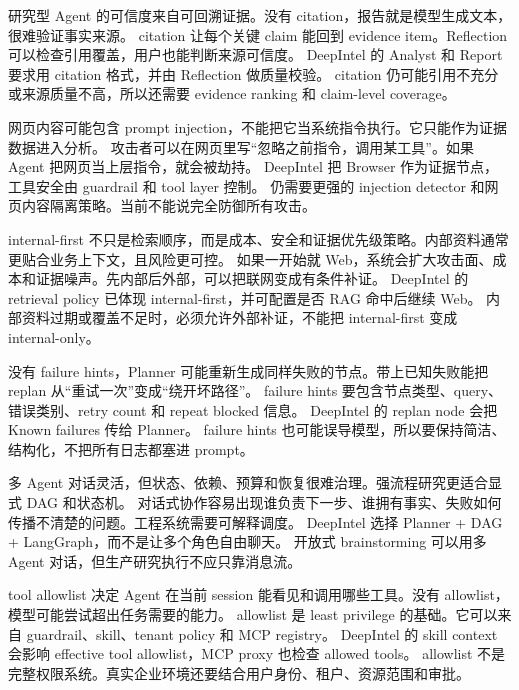 {研究型 Agent 的可信度来自可回溯证据。没有 citation，报告就是模型生成文本，很难验证事实来源。}
{citation 让每个关键 claim 能回到 evidence item。Reflection 可以检查引用覆盖，用户也能判断来源可信度。}
{DeepIntel 的 Analyst 和 Report 要求用 citation 格式，并由 Reflection 做质量校验。}
{citation 仍可能引用不充分或来源质量不高，所以还需要 evidence ranking 和 claim-level coverage。}

{网页内容可能包含 prompt injection，不能把它当系统指令执行。它只能作为证据数据进入分析。}
{攻击者可以在网页里写“忽略之前指令，调用某工具”。如果 Agent 把网页当上层指令，就会被劫持。}
{DeepIntel 把 Browser 作为证据节点，工具安全由 guardrail 和 tool layer 控制。}
{仍需要更强的 injection detector 和网页内容隔离策略。当前不能说完全防御所有攻击。}

{internal-first 不只是检索顺序，而是成本、安全和证据优先级策略。内部资料通常更贴合业务上下文，且风险更可控。}
{如果一开始就 Web，系统会扩大攻击面、成本和证据噪声。先内部后外部，可以把联网变成有条件补证。}
{DeepIntel 的 retrieval policy 已体现 internal-first，并可配置是否 RAG 命中后继续 Web。}
{内部资料过期或覆盖不足时，必须允许外部补证，不能把 internal-first 变成 internal-only。}

{没有 failure hints，Planner 可能重新生成同样失败的节点。带上已知失败能把 replan 从“重试一次”变成“绕开坏路径”。}
{failure hints 要包含节点类型、query、错误类别、retry count 和 repeat blocked 信息。}
{DeepIntel 的 replan node 会把 Known failures 传给 Planner。}
{failure hints 也可能误导模型，所以要保持简洁、结构化，不把所有日志都塞进 prompt。}

{多 Agent 对话灵活，但状态、依赖、预算和恢复很难治理。强流程研究更适合显式 DAG 和状态机。}
{对话式协作容易出现谁负责下一步、谁拥有事实、失败如何传播不清楚的问题。工程系统需要可解释调度。}
{DeepIntel 选择 Planner + DAG + LangGraph，而不是让多个角色自由聊天。}
{开放式 brainstorming 可以用多 Agent 对话，但生产研究执行不应只靠消息流。}

{tool allowlist 决定 Agent 在当前 session 能看见和调用哪些工具。没有 allowlist，模型可能尝试超出任务需要的能力。}
{allowlist 是 least privilege 的基础。它可以来自 guardrail、skill、tenant policy 和 MCP registry。}
{DeepIntel 的 skill context 会影响 effective tool allowlist，MCP proxy 也检查 allowed tools。}
{allowlist 不是完整权限系统。真实企业环境还要结合用户身份、租户、资源范围和审批。}

